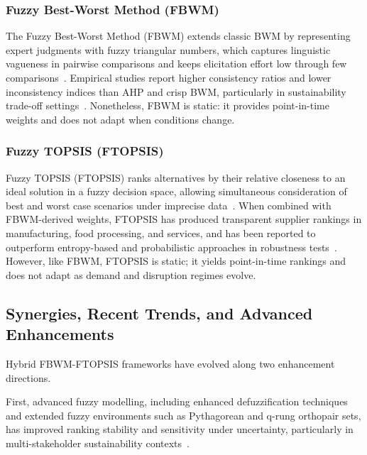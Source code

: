 \documentclass[preprint,12pt]{elsarticle}
\begin{document}
\subsubsection{Fuzzy Best-Worst Method (FBWM)}
The Fuzzy Best-Worst Method (FBWM) extends classic BWM by representing expert judgments with fuzzy triangular numbers, which captures linguistic vagueness in pairwise comparisons and keeps elicitation effort low through few comparisons~\citep{Celik_Kahraman_2021}. Empirical studies report higher consistency ratios and lower inconsistency indices than AHP and crisp BWM, particularly in sustainability trade-off settings~\citep{haseli_2024_sf_bwm_cis,dong_etal_2021_gscm}. Nonetheless, FBWM is static: it provides point-in-time weights and does not adapt when conditions change.

\subsubsection{Fuzzy TOPSIS (FTOPSIS)}
Fuzzy TOPSIS (FTOPSIS) ranks alternatives by their relative closeness to an ideal solution in a fuzzy decision space, allowing simultaneous consideration of best and worst case scenarios under imprecise data~\citep{Jalali_etal_2022}. When combined with FBWM-derived weights, FTOPSIS has produced transparent supplier rankings in manufacturing, food processing, and services, and has been reported to outperform entropy-based and probabilistic approaches in robustness tests~\citep{Zhang_Zong_Dou_Zhao_Tang_Li_2021}. However, like FBWM, FTOPSIS is static; it yields point-in-time rankings and does not adapt as demand and disruption regimes evolve.

\subsection{Synergies, Recent Trends, and Advanced Enhancements}
Hybrid FBWM-FTOPSIS frameworks have evolved along two enhancement directions.


First, advanced fuzzy modelling, including enhanced defuzzification techniques and extended fuzzy environments such as Pythagorean and q-rung orthopair sets, has improved ranking stability and sensitivity under uncertainty, particularly in multi-stakeholder sustainability contexts~\citep{Recent_fuzzy_extensions_2024}.
\end{document}

